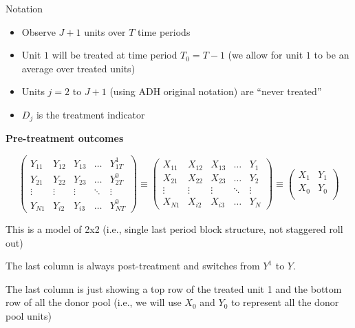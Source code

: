 \documentclass{beamer}
\begin{document}
\begin{frame}{Notation}

\begin{itemize}
\item Observe $J+1$ units over $T$ time periods
\item Unit $1$ will be treated at time period $T_0=T-1$ (we allow for unit $1$ to be an average over treated units)
\item Units $j=2 $ to $J+1$ (using ADH original notation) are ``never treated''
\item $D_j$ is the treatment indicator
\end{itemize}

\end{frame}


\begin{frame}[plain,shrink=20]
\begin{center}
\textbf{Pre-treatment outcomes}
\end{center}

\begin{center}
\[ \left( \begin{array}{ccccc}
    Y_{11} & Y_{12} & Y_{13} & \dots  & Y_{1T}^1 \\
    Y_{21} & Y_{22} & Y_{23} & \dots  & Y_{2T}^0  \\
    \vdots & \vdots & \vdots & \ddots & \vdots \\
    Y_{N1} & Y_{i2} & Y_{i3} & \dots  & Y_{NT}^0
\end{array} \right) \equiv
\left( \begin{array}{ccccc}
    X_{11} & X_{12} & X_{13} & \dots  & Y_{1} \\
    X_{21} & X_{22} & X_{23} & \dots  & Y_{2}  \\
    \vdots & \vdots & \vdots & \ddots & \vdots \\
    X_{N1} & X_{i2} & X_{i3} & \dots  & Y_{N}
\end{array} \right) \equiv
\left( \begin{array}{cc}
    X_{1} & Y_{1} \\
    X_{0} & Y_{0}  \\
\end{array} \right)
\]

\end{center}

This is a model of 2x2 (i.e., single last period block structure, not staggered roll out)

\bigskip

The last column is always post-treatment and switches from $Y^1$ to $Y$. 

\bigskip

The last column is just showing a top row of the treated unit 1 and the bottom row of all the donor pool (i.e., we will use $X_0$ and $Y_0$ to represent all the donor pool units)

\end{frame}
\end{document}
